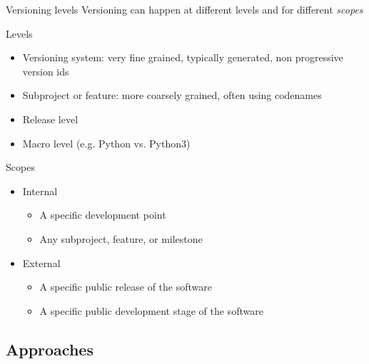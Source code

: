\documentclass[presentation]{beamer}
\begin{document}
\begin{frame}{Versioning levels}
    Versioning can happen at different levels and for different \textit{scopes}
    \begin{block}{Levels}
        \begin{itemize}
            \item Versioning system: very fine grained, typically generated, non progressive version ids
            \item Subproject or feature: more coarsely grained, often using codenames
            \item Release level
            \item Macro level (e.g. Python vs. Python3)
        \end{itemize}
    \end{block}
    \begin{block}{Scopes}
        \begin{itemize}
            \item Internal
            \begin{itemize}
                \item A specific development point
                \item Any subproject, feature, or milestone
            \end{itemize}
            \item External
            \begin{itemize}
                \item A specific public release of the software
                \item A specific public development stage of the software
            \end{itemize}
        \end{itemize}
    \end{block}
\end{frame}

\subsection{Approaches}
\end{document}

